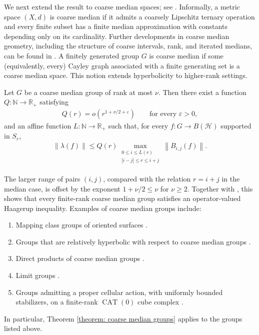 \documentclass[12pt,reqno]{amsart}
\newcommand{\N}{\mathbb{N}}
\newcommand{\norm}[1]{\left\|#1\right\|}
\newcommand{\R}{\mathbb{R}}
\newcommand{\Hil}{\mathcal{H}}
\newcommand{\CAT}{\operatorname{CAT}(0)}
\numberwithin{equation}{section}
\begin{document}
We next extend the result to coarse median spaces; see \cite{Bowditch2013coarsemedian}. Informally, a metric space $(X,d)$ is coarse median if it admits a coarsely Lipschitz ternary operation and every finite subset has a finite median approximation with constants depending only on its cardinality. Further developments in coarse median geometry, including the structure of coarse intervals, rank, and iterated medians, can be found in \cite{SpakulaWright2017propertyA, NibloWrightZang2019fourpoint, NibloWrightZang2021}. A finitely generated group $G$ is coarse median if some (equivalently, every) Cayley graph associated with a finite generating set is a coarse median space. This notion extends hyperbolicity to higher-rank settings.
\begin{theorem}\label{theorem: coarse median groups}
    Let $G$ be a coarse median group of rank at most $\nu$. Then there exist a function $Q:\N\to\R_+$ satisfying
    \begin{align*}
        Q(r)=o(r^{1+\nu/2+\varepsilon})\qquad\text{for every }\varepsilon>0,
    \end{align*}
    and an affine function $L:\N\to\R_+$ such that, for every $f:G\to B(\Hil)$ supported in $S_r$,
    \begin{align*}
        \norm{\lambda(f)}\le Q(r)\max_{\substack{0\le i \le L(r)\\ |i-j|\le r\le i+j}}\norm{B_{i,j}(f)}.
    \end{align*}
\end{theorem}
The larger range of pairs $(i,j)$, compared with the relation $r=i+j$ in the median case, is offset by the exponent $1+\nu/2\le\nu$ for $\nu\ge2$. Together with \cite{ToyotaYang2026OVhyperbolic}, this shows that every finite-rank coarse median group satisfies an operator-valued Haagerup inequality. Examples of coarse median groups include:
\begin{enumerate}
    \item Mapping class groups of oriented surfaces \cite[Theorem 8.2]{Bowditch2014embedding}.
    \item Groups that are relatively hyperbolic with respect to coarse median groups \cite[Theorem 1.1]{Bowditch2013invariancehyperbolicity}.
    \item Direct products of coarse median groups \cite[Example 1.4.2.3]{Bowditch2019notes}.
    \item Limit groups \cite[Example 1.4.2.5]{Bowditch2019notes}.
    \item Groups admitting a proper cellular action, with uniformly bounded stabilizers, on a finite-rank $\CAT$ cube complex \cite[Corollary 3.5, Remark 3.6]{Sapir2015centroids}.
\end{enumerate}
In particular, Theorem \ref{theorem: coarse median groups} applies to the groups listed above.
\end{document}
